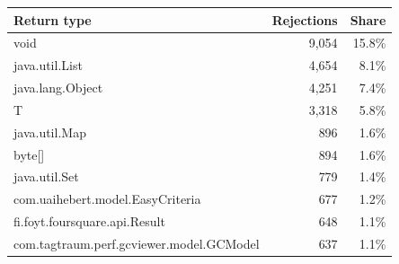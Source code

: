   \renewcommand{\theHreporttablerow}{rq6_return_type_rejections.\arabic{reporttablerow}}
  \setcounter{reporttablerow}{0}
  \begin{tabular}{lrr}
  \toprule
  Return type & Rejections & Share \\
  \midrule
  {reporttablerow}\label{tabrow:rq6_return_type_rejections:void}void & 9,054 & 15.8\% \\
  {reporttablerow}\label{tabrow:rq6_return_type_rejections:java.util.List}java.util.List & 4,654 & 8.1\% \\
  {reporttablerow}\label{tabrow:rq6_return_type_rejections:java.lang.Object}java.lang.Object & 4,251 & 7.4\% \\
  {reporttablerow}\label{tabrow:rq6_return_type_rejections:T}T & 3,318 & 5.8\% \\
  {reporttablerow}\label{tabrow:rq6_return_type_rejections:java.util.Map}java.util.Map & 896 & 1.6\% \\
  {reporttablerow}\label{tabrow:rq6_return_type_rejections:byte@5B@5D}byte[] & 894 & 1.6\% \\
  {reporttablerow}\label{tabrow:rq6_return_type_rejections:java.util.Set}java.util.Set & 779 & 1.4\% \\
  {reporttablerow}\label{tabrow:rq6_return_type_rejections:com.uaihebert.model.EasyCriteria}com.uaihebert.model.EasyCriteria & 677 & 1.2\% \\
  {reporttablerow}\label{tabrow:rq6_return_type_rejections:fi.foyt.foursquare.api.Result}fi.foyt.foursquare.api.Result & 648 & 1.1\% \\
  {reporttablerow}\label{tabrow:rq6_return_type_rejections:com.tagtraum.perf.gcviewer.model.GCModel}com.tagtraum.perf.gcviewer.model.GCModel & 637 & 1.1\% \\
  \bottomrule
  \end{tabular}
